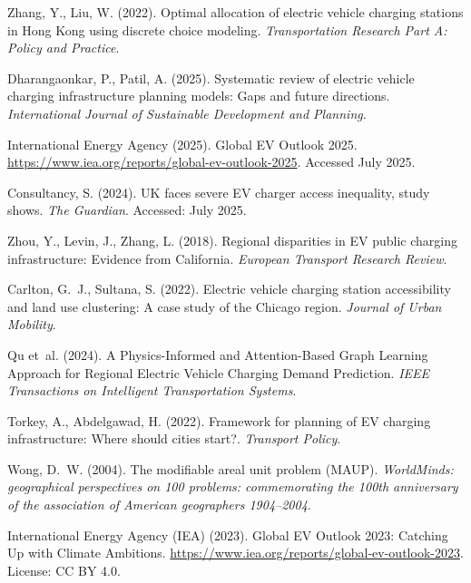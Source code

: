 Zhang, Y., Liu, W. (2022). Optimal allocation of electric vehicle charging stations in Hong Kong using discrete choice modeling.
\textit{Transportation Research Part A: Policy and Practice}.

Dharangaonkar, P., Patil, A. (2025). Systematic review of electric vehicle charging infrastructure planning models: Gaps and future directions.
\textit{International Journal of Sustainable Development and Planning}.

International Energy Agency (2025). Global EV Outlook 2025.
\url{https://www.iea.org/reports/global-ev-outlook-2025}. Accessed July 2025.

Consultancy, S. (2024). UK faces severe EV charger access inequality, study shows.
\textit{The Guardian}.
Accessed: July 2025.

Zhou, Y., Levin, J., Zhang, L. (2018). Regional disparities in EV public charging infrastructure: Evidence from California.
\textit{European Transport Research Review}.

Carlton, G.~J., Sultana, S. (2022). Electric vehicle charging station accessibility and land use clustering: A case study of the Chicago region.
\textit{Journal of Urban Mobility}.

Qu et~al. (2024). A Physics-Informed and Attention-Based Graph Learning Approach for Regional Electric Vehicle Charging Demand Prediction.
\textit{IEEE Transactions on Intelligent Transportation Systems}.

Torkey, A., Abdelgawad, H. (2022). Framework for planning of EV charging infrastructure: Where should cities start?.
\textit{Transport Policy}.

Wong, D.~W. (2004). The modifiable areal unit problem (MAUP).
\textit{WorldMinds: geographical perspectives on 100 problems: commemorating the 100th anniversary of the association of American geographers 1904--2004}.

International Energy Agency (IEA) (2023). Global EV Outlook 2023: Catching Up with Climate Ambitions.
\url{https://www.iea.org/reports/global-ev-outlook-2023}. License: CC BY 4.0.

